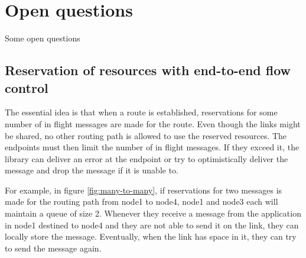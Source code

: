 \documentclass[a4paper,twoside]{report} %
\begin{document}





\section{Open questions}
Some open questions

\subsection{Reservation of resources with end-to-end flow control}
The essential idea is that when a route is established,
reservations for some number of in flight messages are made for the route.
Even though the links might be shared,
no other routing path is allowed to use the reserved resources.
The endpoints must then limit the number of in flight messages.
If they exceed it, the library can deliver an error at the endpoint or try to
optimistically deliver the message and drop the message if it is unable to.

For example, in figure \ref{fig:many-to-many},
if reservations for two messages is made for the routing path
from node1 to node4, node1 and node3 each will maintain a queue of size 2.
Whenever they receive a message from the application in node1 destined to node4
and they are not able to send it on the link,
they can locally store the message.
Eventually, when the link has space in it,
they can try to send the message again.
\end{document}
